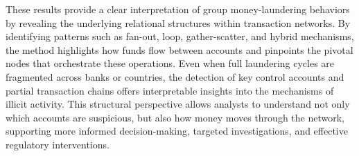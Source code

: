 \documentclass[11pt,english]{article}
\begin{document}
These results provide a clear interpretation of group money-laundering behaviors by revealing the underlying relational structures within transaction networks. By identifying patterns such as fan-out, loop, gather-scatter, and hybrid mechanisms, the method highlights how funds flow between accounts and pinpoints the pivotal nodes that orchestrate these operations. Even when full laundering cycles are fragmented across banks or countries, the detection of key control accounts and partial transaction chains offers interpretable insights into the mechanisms of illicit activity. This structural perspective allows analysts to understand not only which accounts are suspicious, but also how money moves through the network, supporting more informed decision-making, targeted investigations, and effective regulatory interventions.
\end{document}
